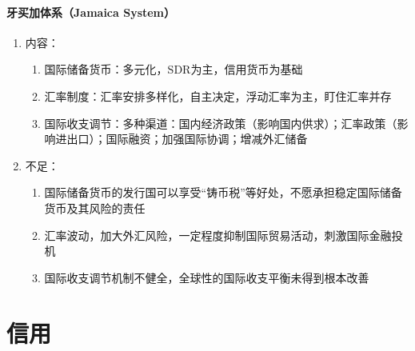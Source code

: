 \documentclass[12pt]{book}
\begin{document}
\subsubsection{牙买加体系（Jamaica System）}

\begin{enumerate}[1.]
    \item 内容：
          \begin{enumerate}[(1)]
              \item 国际储备货币：多元化，SDR为主，信用货币为基础
              \item 汇率制度：汇率安排多样化，自主决定，浮动汇率为主，盯住汇率并存
              \item 国际收支调节：多种渠道：国内经济政策（影响国内供求）；汇率政策（影响进出口）；国际融资；加强国际协调；增减外汇储备
          \end{enumerate}
    \item 不足：
          \begin{enumerate}[(1)]
              \item 国际储备货币的发行国可以享受“铸币税”等好处，不愿承担稳定国际储备货币及其风险的责任
              \item 汇率波动，加大外汇风险，一定程度抑制国际贸易活动，刺激国际金融投机
              \item 国际收支调节机制不健全，全球性的国际收支平衡未得到根本改善
          \end{enumerate}
\end{enumerate}



\chapter{信用}
\end{document}
